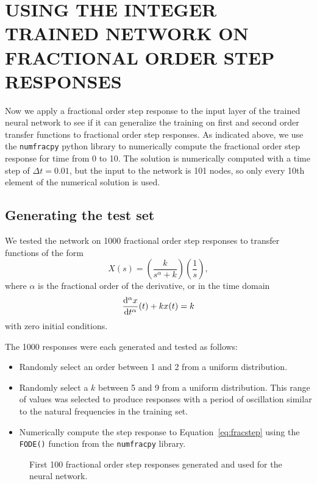 \section{USING THE INTEGER TRAINED NETWORK ON FRACTIONAL ORDER STEP RESPONSES}
\label{sec:generalize}

Now we apply a fractional order step response to the input layer of the trained
neural network to see if it can generalize the training on first and second
order transfer functions to fractional order step responses. As indicated above,
we use the \texttt{numfracpy} python library to numerically compute the
fractional order step response for time from 0 to 10. The solution is
numerically computed with a time step of $\Delta t = 0.01$, but the input to the
network is 101 nodes, so only every 10th element of the numerical solution is
used.

\subsection{Generating the test set}
We tested the network on 1000 fractional order step responses to transfer
functions of the form
\[
  X(s) = \left( \frac{k}{s^\alpha + k} \right) \left( \frac{1}{s} \right),
\]
where $\alpha$ is the fractional order of the derivative, or in the time domain
\begin{equation}
\frac{\mathrm{d}^\alpha x}{\mathrm{d} t^\alpha}(t) + k x(t) = k
\label{eq:fracstep}
\end{equation}
with zero initial conditions. 

The 1000 responses were each generated and tested as follows: 
\begin{itemize}
\item Randomly select an order between 1 and 2 from a uniform distribution.
\item Randomly select a $k$ between 5 and 9 from a uniform distribution. This
  range of values was selected to produce responses with a period of oscillation
  similar to the natural frequencies in the training set.
\item Numerically compute the step response to Equation~\ref{eq:fracstep} using
the \texttt{FODE()} function from the \texttt{numfracpy} library. 
\end{itemize}

\begin{figure}
\centering

\vspace*{-5pt}
\caption{First 100 fractional order step responses generated and used for the
neural network.}
\label{fig:steps}
\end{figure}

